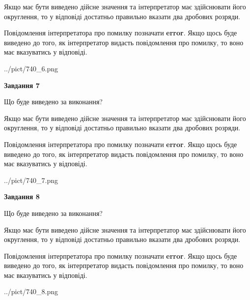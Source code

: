 \documentclass[12pt, ukrainian]{article}
\begin{document}
{\begin {Large}
Якщо має бути виведено дійсне значення та інтерпретатор має здійснювати його округлення, 
то у відповіді достатньо правильно вказати два дробових розряди.

Повідомлення інтерпретатора про помилку позначати \textbf{error}.
Якщо щось буде виведено до того, як інтерпретатор видасть повідомлення про помилку, 
то воно має вказуватись у відповіді. \par

\begin{center}
	{../pict/740_6.png}
\end{center}
\newpage

{\begin {center}\textbf{Завдання 7}\end {center}}\par
Що буде виведено за виконання? \par

Якщо має бути виведено дійсне значення та інтерпретатор має здійснювати його округлення, 
то у відповіді достатньо правильно вказати два дробових розряди.

Повідомлення інтерпретатора про помилку позначати \textbf{error}.
Якщо щось буде виведено до того, як інтерпретатор видасть повідомлення про помилку, 
то воно має вказуватись у відповіді. \par

\begin{center}
	{../pict/740_7.png}
\end{center}
\newpage

{\begin {center}\textbf{Завдання 8}\end {center}}\par
Що буде виведено за виконання? \par

Якщо має бути виведено дійсне значення та інтерпретатор має здійснювати його округлення, 
то у відповіді достатньо правильно вказати два дробових розряди.

Повідомлення інтерпретатора про помилку позначати \textbf{error}.
Якщо щось буде виведено до того, як інтерпретатор видасть повідомлення про помилку, 
то воно має вказуватись у відповіді. \par

\begin{center}
	{../pict/740_8.png}
\end{center}
\newpage


\end{Large}}
\end{document}
